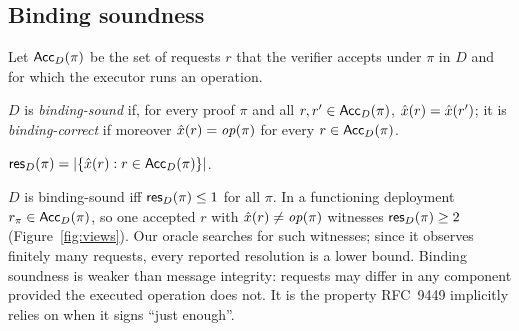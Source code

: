 \subsection{Binding soundness}\label{sec:model:soundness}

Let $\mathsf{Acc}_D(\pi)$ be the set of requests $r$ that the verifier accepts under
$\pi$ in $D$ and for which the executor runs an operation.

\begin{definition}\label{def:soundness}
$D$ is \emph{binding-sound} if, for every proof $\pi$ and all
$r,r'\in\mathsf{Acc}_D(\pi)$, $\hat{x}(r)=\hat{x}(r')$; it is \emph{binding-correct}
if moreover $\hat{x}(r)=\mathit{op}(\pi)$ for every $r\in\mathsf{Acc}_D(\pi)$.
\end{definition}

\begin{definition}\label{def:resolution}
$\mathsf{res}_D(\pi)=\lvert\{\hat{x}(r) : r\in\mathsf{Acc}_D(\pi)\}\rvert$.
\end{definition}

$D$ is binding-sound iff $\mathsf{res}_D(\pi)\le 1$ for all $\pi$. In a functioning
deployment $r_\pi\in\mathsf{Acc}_D(\pi)$, so one accepted $r$ with
$\hat{x}(r)\neq\mathit{op}(\pi)$ witnesses $\mathsf{res}_D(\pi)\ge 2$
(Figure~\ref{fig:views}). Our oracle searches for such witnesses; since it
observes finitely many requests, every reported resolution is a lower bound.
Binding soundness is weaker than message integrity: requests may differ in any
component provided the executed operation does not. It is the property
RFC~9449 implicitly relies on when it signs ``just enough''.

